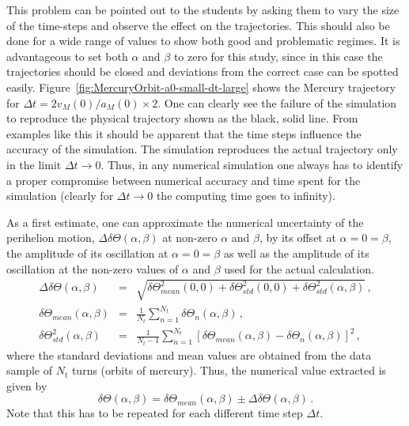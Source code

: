 \documentclass[12pt,ngerman,american]{iopart}
\begin{document}
This problem can be pointed out to the students by asking them to vary the size of the time-steps and observe the effect on the trajectories.
This should also be done for a wide range of values to show both good and problematic regimes.
It is advantageous to set both $\alpha$ and $\beta$ to zero for this study, since in this case the trajectories should be closed and deviations from the correct case can be spotted easily.
Figure~\ref{fig:MercuryOrbit-a0-small-dt-large} shows the Mercury trajectory for $\Delta t=2 v_M(0) /a_M(0) \times 2$.
One can clearly see the failure of the simulation to reproduce the physical trajectory shown as the black, solid line.
From examples like this it should be apparent that the time steps influence the accuracy of the simulation.
The simulation reproduces the actual trajectory only in the limit $\Delta t \rightarrow 0$. Thus, in any numerical simulation
one always has to identify a proper compromise between numerical accuracy and time spent for the simulation
(clearly for $\Delta t\to 0$ the computing time goes to infinity).

As a first estimate, one can approximate the numerical uncertainty of the perihelion motion, $\Delta \delta \Theta (\alpha, \beta)$ at non-zero $\alpha$ and $\beta$, by its offset
 at $\alpha = 0 = \beta$,  the amplitude of its oscillation at $\alpha = 0 = \beta$ as well as the amplitude of its oscillation at the non-zero values of $\alpha$ and $\beta$
 used for the actual calculation.
\begin{eqnarray}\label{eq:num-uncertainty}
	\Delta \delta \Theta (\alpha, \beta) &=& \sqrt{
		\delta \Theta_{mean}^2 (0, 0) + 
		\delta \Theta_{std}^2 (0, 0) + 
		\delta \Theta_{std}^2 (\alpha, \beta)
	} \, ,
	\\
	\delta \Theta_{mean} (\alpha, \beta)
	&=& 
	\frac{1}{N_{t}}
	\sum\limits_{n=1}^{N_{t}} \delta \Theta_{n} (\alpha, \beta) \, ,
	\\
	\delta \Theta_{std}^2 (\alpha, \beta)
	&=& 
	\frac{1}{N_{t}-1}
	\sum\limits_{n=1}^{N_{t}} \left[
		\delta \Theta_{mean} (\alpha, \beta) - \delta \Theta_{n} (\alpha, \beta)
	\right]^2 \, ,
\end{eqnarray}
where the standard deviations and mean values are obtained from the data sample of $N_t$ turns (orbits of mercury).
Thus, the numerical value extracted is given by
\begin{equation}\label{eq:num-vals}
	\delta \Theta (\alpha, \beta) = \delta \Theta_{mean} (\alpha, \beta)  \pm \Delta \delta \Theta (\alpha, \beta)
	\, .
\end{equation}
Note that this has to be repeated for each different time step $\Delta t$.
\end{document}
